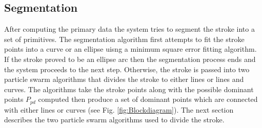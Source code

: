 \documentclass[a4paper,10pt]{IEEEconf}
\begin{document}
\subsection{Segmentation}
\label{seg}
After computing the primary data the system tries to segment the stroke into a set of primitives. The segmentation algorithm first attempts to fit the stroke points into a curve or an ellipse uisng a minimum square error fitting algorithm. If the stroke proved to be an ellipse arc then the segmentation process ends and the system proceeds to the next step. Otherwise, the stroke is passed into two particle swarm algorithms that divides the stroke to either lines or lines and curves. The algorithms take the stroke points along with the possible dominant points $P_{pd}$ computed then produce a set of dominant points which are connected with either lines or curves (see Fig. \ref{fig:Blockdiagram}). The next section describes the two particle swarm algorithms used to divide the stroke.
\end{document}
